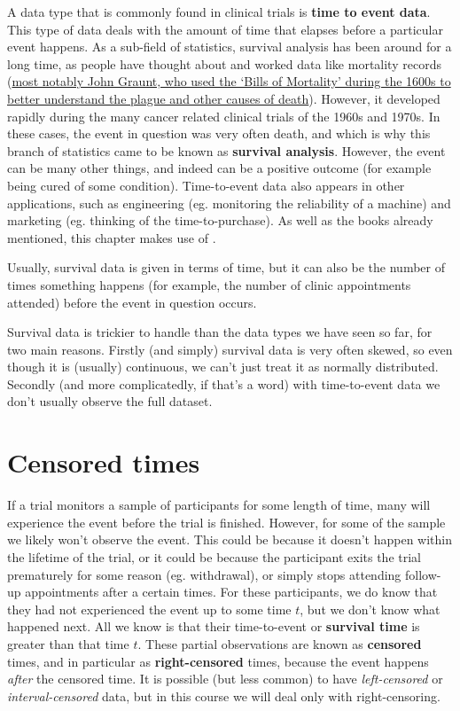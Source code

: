 \documentclass[
  openany]{book}
\theoremstyle{definition}
\theoremstyle{definition}
\theoremstyle{definition}
\theoremstyle{definition}
\theoremstyle{remark}
\begin{document}
A data type that is commonly found in clinical trials is \textbf{time to event data}. This type of data deals with the amount of time that elapses before a particular event happens. As a sub-field of statistics, survival analysis has been around for a long time, as people have thought about and worked data like mortality records (\href{https://rss.onlinelibrary.wiley.com/doi/full/10.1111/1740-9713.01421}{most notably John Graunt, who used the `Bills of Mortality' during the 1600s to better understand the plague and other causes of death}). However, it developed rapidly during the many cancer related clinical trials of the 1960s and 1970s. In these cases, the event in question was very often death, and which is why this branch of statistics came to be known as \textbf{survival analysis}. However, the event can be many other things, and indeed can be a positive outcome (for example being cured of some condition). Time-to-event data also appears in other applications, such as engineering (eg. monitoring the reliability of a machine) and marketing (eg. thinking of the time-to-purchase). As well as the books already mentioned, this chapter makes use of \citet{collett_surv}.

Usually, survival data is given in terms of time, but it can also be the number of times something happens (for example, the number of clinic appointments attended) before the event in question occurs.

Survival data is trickier to handle than the data types we have seen so far, for two main reasons. Firstly (and simply) survival data is very often skewed, so even though it is (usually) continuous, we can't just treat it as normally distributed. Secondly (and more complicatedly, if that's a word) with time-to-event data we don't usually observe the full dataset.

\hypertarget{censored-times}{%
\section{Censored times}\label{censored-times}}

If a trial monitors a sample of participants for some length of time, many will experience the event before the trial is finished. However, for some of the sample we likely won't observe the event. This could be because it doesn't happen within the lifetime of the trial, or it could be because the participant exits the trial prematurely for some reason (eg. withdrawal), or simply stops attending follow-up appointments after a certain times. For these participants, we do know that they had not experienced the event up to some time \(t\), but we don't know what happened next. All we know is that their time-to-event or \textbf{survival time} is greater than that time \(t\). These partial observations are known as \textbf{censored} times, and in particular as \textbf{right-censored} times, because the event happens \emph{after} the censored time. It is possible (but less common) to have \emph{left-censored} or \emph{interval-censored} data, but in this course we will deal only with right-censoring.
\end{document}
